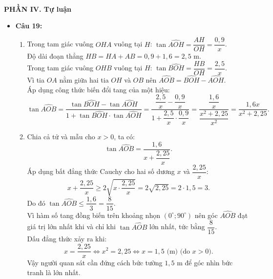 \documentclass[12pt,a4paper]{article}
\begin{document}
\vspace{0.2cm}
\textbf{PHẦN IV. Tự luận}
\begin{itemize}[leftmargin=0.6cm, itemsep=4pt]
    \item \textbf{Câu 19:}
    \begin{enumerate}
        \item Trong tam giác vuông $OHA$ vuông tại $H$: $\tan \widehat{AOH} = \dfrac{AH}{OH} = \dfrac{0{,}9}{x}$.\\
        Độ dài đoạn thẳng $HB = HA + AB = 0{,}9 + 1{,}6 = 2{,}5\text{ m}$.\\
        Trong tam giác vuông $OHB$ vuông tại $H$: $\tan \widehat{BOH} = \dfrac{HB}{OH} = \dfrac{2{,}5}{x}$.\\
        Vì tia $OA$ nằm giữa hai tia $OH$ và $OB$ nên $\widehat{AOB} = \widehat{BOH} - \widehat{AOH}$.\\
        Áp dụng công thức biến đổi tang của một hiệu:
        \[
        \tan \widehat{AOB} = \dfrac{\tan \widehat{BOH} - \tan \widehat{AOH}}{1 + \tan \widehat{BOH} \cdot \tan \widehat{AOH}} = \dfrac{\dfrac{2{,}5}{x} - \dfrac{0{,}9}{x}}{1 + \dfrac{2{,}5}{x} \cdot \dfrac{0{,}9}{x}} = \dfrac{\dfrac{1{,}6}{x}}{\dfrac{x^2 + 2{,}25}{x^2}} = \dfrac{1{,}6x}{x^2 + 2{,}25}.
        \]
        \item Chia cả tử và mẫu cho $x > 0$, ta có:
        \[
        \tan \widehat{AOB} = \dfrac{1{,}6}{x + \dfrac{2{,}25}{x}}.
        \]
        Áp dụng bất đẳng thức Cauchy cho hai số dương $x$ và $\dfrac{2{,}25}{x}$:
        \[
        x + \dfrac{2{,}25}{x} \ge 2\sqrt{x \cdot \dfrac{2{,}25}{x}} = 2\sqrt{2{,}25} = 2 \cdot 1{,}5 = 3.
        \]
        Do đó $\tan \widehat{AOB} \le \dfrac{1{,}6}{3} = \dfrac{8}{15}$.\\
        Vì hàm số tang đồng biến trên khoảng nhọn $(0^\circ; 90^\circ)$ nên góc $\widehat{AOB}$ đạt giá trị lớn nhất khi và chỉ khi $\tan \widehat{AOB}$ lớn nhất, tức bằng $\dfrac{8}{15}$.\\
        Dấu đẳng thức xảy ra khi:
        \[
        x = \dfrac{2{,}25}{x} \iff x^2 = 2{,}25 \iff x = 1{,}5\text{ (m) (do } x > 0\text{)}.
        \]
        Vậy người quan sát cần đứng cách bức tường $1{,}5\text{ m}$ để góc nhìn bức tranh là lớn nhất.
    \end{enumerate}


\end{itemize}
\end{document}
